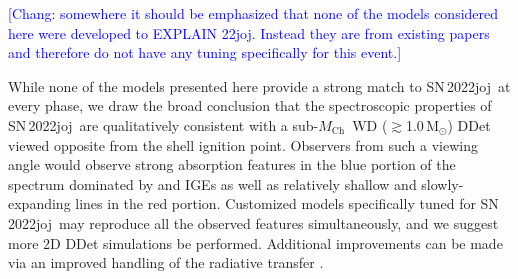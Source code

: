 \documentclass[twocolumn]{aastex631}
\newcommand{\sn}{SN\,2022joj}
\newcommand{\Mch}{$M_\mathrm{Ch}$}
\newcommand{\chang}[1]{\textcolor{blue}{[Chang: #1]}}
\begin{document}
\begin{CJK*}{UTF8}{gbsn}
\chang{somewhere it should be emphasized that none of the models considered here were developed to EXPLAIN 22joj. Instead they are from existing papers and therefore do not have any tuning specifically for this event.}

While none of the models presented here provide a strong match to \sn\ at every phase, we draw the broad conclusion that the spectroscopic properties of \sn\ are qualitatively consistent with a sub-\Mch\ WD ($\gtrsim$1.0\,$\mathrm{M_\odot}$) DDet viewed opposite from the shell ignition point. Observers from such a viewing angle would observe strong absorption features in the blue portion of the spectrum dominated by  and IGEs as well as relatively shallow and slowly-expanding  lines in the red portion. Customized models specifically tuned for \sn\ may reproduce all the observed features simultaneously, and we suggest more 2D DDet simulations be performed. Additional improvements can be made via an improved handling of the radiative transfer \citep[e.g., non-LTE effects; see][]{Shen_NLTE_2021}.


\end{CJK*}
\end{document}
